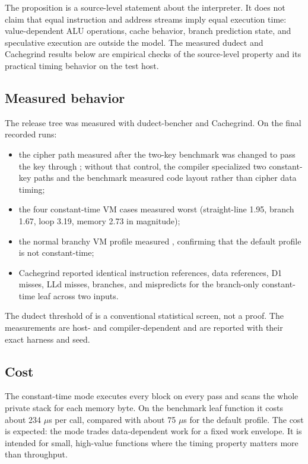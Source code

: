 The proposition is a source-level statement about the interpreter. It does not
claim that equal instruction and address streams imply equal execution time:
value-dependent ALU operations, cache behavior, branch prediction state, and
speculative execution are outside the model. The measured dudect and Cachegrind
results below are empirical checks of the source-level property and its practical
timing behavior on the test host.

\subsection{Measured behavior}

The release tree was measured with dudect-bencher and Cachegrind. On the final
recorded runs:

\begin{itemize}
  \item the cipher path measured  after the two-key benchmark
        was changed to pass the key through ; without that
        control, the compiler specialized two constant-key paths and the
        benchmark measured code layout rather than cipher data timing;
  \item the four constant-time VM cases measured worst 
        (straight-line 1.95, branch 1.67, loop 3.19, memory 2.73 in magnitude);
  \item the normal branchy VM profile measured , confirming
        that the default profile is not constant-time;
  \item Cachegrind reported identical instruction references, data references,
        D1 misses, LLd misses, branches, and mispredicts for the branch-only
        constant-time leaf across two inputs.
\end{itemize}

The dudect threshold of  is a conventional statistical screen, not
a proof. The measurements are host- and compiler-dependent and are reported with
their exact harness and seed.

\subsection{Cost}

The constant-time mode executes every block on every pass and scans the whole
private stack for each memory byte. On the benchmark leaf function it costs about
234 $\mu$s per call, compared with about 75 $\mu$s for the
default profile. The cost is expected: the mode trades data-dependent work for a
fixed work envelope. It is intended for small, high-value functions where the
timing property matters more than throughput.

